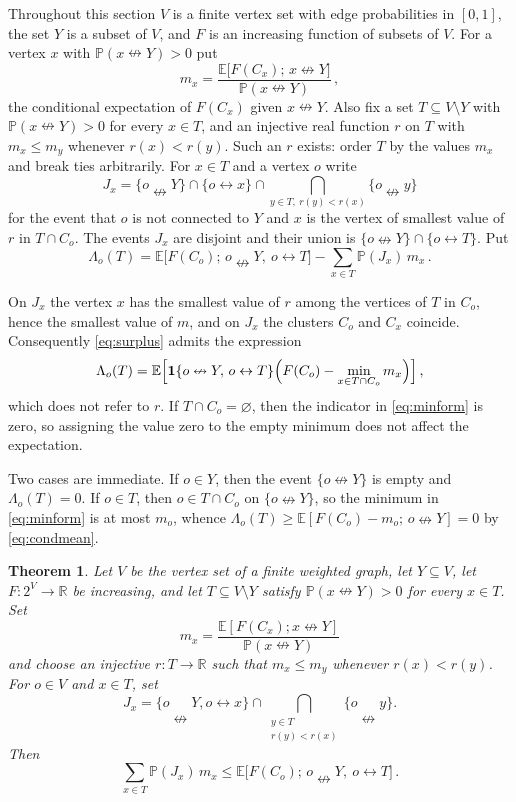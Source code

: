\documentclass[11pt]{article}
\newtheorem{theorem}{Theorem}[section]
\theoremstyle{definition}
\theoremstyle{remark}
\newcommand{\PP}{\mathbb P}
\newcommand{\EE}{\mathbb E}
\newcommand{\one}{\mathbf 1}
\newcommand{\con}{\leftrightarrow}
\newcommand{\ncon}{\nleftrightarrow}
\begin{document}
Throughout this section $V$ is a finite vertex set with edge probabilities in $[0,1]$, the set
$Y$ is a subset of $V$, and $F$ is an increasing function of subsets of $V$. For a vertex
$x$ with $\PP(x\ncon Y)>0$ put
\begin{equation}\label{eq:condmean}
 m_x=\frac{\EE\bigl[F(C_x);\,x\ncon Y\bigr]}{\PP(x\ncon Y)}\,,
\end{equation}
the conditional expectation of $F(C_x)$ given $x\ncon Y$. Also fix a set $T\subseteq V\setminus Y$
with $\PP(x\ncon Y)>0$ for every $x\in T$, and an injective real function $r$ on $T$ with
$m_x\leq m_y$ whenever $r(x)<r(y)$. Such an $r$ exists: order $T$ by the values $m_x$ and
break ties arbitrarily. For $x\in T$ and a vertex $o$ write
\begin{equation}\label{eq:pattern}
 J_x=\{o\ncon Y\}\cap\{o\con x\}\cap\bigcap_{y\in T,\ r(y)<r(x)}\{o\ncon y\}
\end{equation}
for the event that $o$ is not connected to $Y$ and $x$ is the vertex of smallest value of
$r$ in $T\cap C_o$. The events $J_x$ are disjoint and their union is
$\{o\ncon Y\}\cap\{o\con T\}$. Put
\begin{equation}\label{eq:surplus}
 \Lambda_o(T)=\EE\bigl[F(C_o);\,o\ncon Y,\ o\con T\bigr]-\sum_{x\in T}\PP(J_x)\,m_x\,.
\end{equation}

On $J_x$ the vertex $x$ has the smallest value of $r$ among the vertices of $T$ in $C_o$,
hence the smallest value of $m$, and on $J_x$ the clusters $C_o$ and $C_x$ coincide.
Consequently \eqref{eq:surplus} admits the expression
\begin{equation}\label{eq:minform}
 \Lambda_o(T)=\EE\Bigl[\one\{o\ncon Y,\,o\con T\}\Bigl(F(C_o)-\min_{x\in T\cap C_o}
 m_x\Bigr)\Bigr]\,,
\end{equation}
which does not refer to $r$. If $T\cap C_o=\varnothing$, then the indicator in
\eqref{eq:minform} is zero, so assigning the value zero to the empty minimum does not
affect the expectation.

Two cases are immediate. If $o\in Y$, then the event $\{o\ncon Y\}$ is
empty and $\Lambda_o(T)=0$. If $o\in T$, then $o\in T\cap C_o$ on $\{o\ncon Y\}$, so the
minimum in \eqref{eq:minform} is at most $m_o$, whence
$\Lambda_o(T)\geq\EE[F(C_o)-m_o;\,o\ncon Y]=0$ by \eqref{eq:condmean}.

\begin{theorem}\label{thm:gen}
Let $V$ be the vertex set of a finite weighted graph, let $Y\subseteq V$, let
$F:2^V\to\mathbb R$ be
increasing, and let $T\subseteq V\setminus Y$ satisfy $\PP(x\ncon Y)>0$ for every $x\in T$.
Set
\[
 m_x=\frac{\EE[F(C_x);x\ncon Y]}{\PP(x\ncon Y)}
\]
and choose an injective $r:T\to\mathbb R$ such that $m_x\leq m_y$ whenever
$r(x)<r(y)$. For $o\in V$ and $x\in T$, set
\[
 J_x=\{o\ncon Y,o\con x\}\cap
      \bigcap_{\substack{y\in T\\r(y)<r(x)}}\{o\ncon y\}.
\]
Then
\[
 \sum_{x\in T}\PP(J_x)\,m_x\leq \EE\bigl[F(C_o);\,o\ncon Y,\ o\con T\bigr]\,.
\]
\end{theorem}
\end{document}
